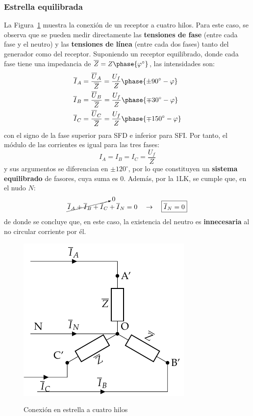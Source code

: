 	\subsubsection{Estrella equilibrada}
	La Figura~\ref{fig:conexion_estrella_4} muestra la conexión de un receptor a cuatro hilos. Para este caso, se observa que se pueden medir directamente las \textbf{tensiones de fase} (entre cada fase y el neutro) y las \textbf{tensiones de línea} (entre cada dos fases) tanto del generador como del receptor. Suponiendo un receptor equilibrado, donde cada fase tiene una impedancia de $\overline{Z}=Z\phase{\varphi^\circ}$, las intensidades son:
	\begin{align*}
      \overline{I}_A &= \dfrac{\overline{U}_A}{\overline{Z}} = \dfrac{U_f}{Z}\phase{\pm 90^\circ - \varphi} \\
      \overline{I}_B &= \frac{\overline{U}_B}{\overline{Z}} = \frac{U_f}{Z}\phase{{\mp 30^\circ} - \varphi}\\
      \overline{I}_C &= \frac{\overline{U}_C}{\overline{Z}} = \frac{U_f}{Z}\phase{{\mp 150^\circ} - \varphi}
    \end{align*}
    con el signo de la fase superior para SFD e inferior para SFI. Por tanto, el módulo de las corrientes es igual para las tres fases: 
    \begin{equation}
        \boxed{I_A = I_B = I_C = \dfrac{U_f}{Z}}
    \end{equation}
    y sus argumentos se diferencian en $\pm120^\circ$, por lo que constituyen un \textbf{sistema equilibrado} de fasores, cuya suma es 0. Además, por la 1LK, se cumple que, en el nudo $N$: 
    \begin{equation}
        \cancelto{0}{\overline{I}_A  + \overline{I}_B + \overline{I}_C} + \overline{I}_N = 0 \quad\rightarrow\quad \boxed{\overline{I}_N = 0}
    \end{equation}
    de donde se concluye que, en este caso, la existencia del neutro es \textbf{innecesaria} al no circular corriente por él. 
	\begin{figure}[H]
		\centering
		{\includegraphics{../figs/EstrellaEquilibrado_Receptor.pdf}}
		\caption{Conexión en estrella a cuatro hilos}
		\label{fig:conexion_estrella_4}
	\end{figure}
	

